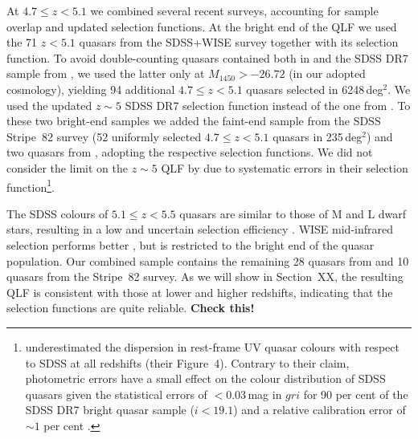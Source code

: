 \documentclass[fleqn,usenatbib]{mnras}
\begin{document}
At $4.7\le z<5.1$ we combined several recent surveys, accounting for
sample overlap and updated selection functions. At the bright end of
the QLF we used the 71 $z<5.1$ quasars from the SDSS+WISE survey
\citep{2016ApJ...829...33Y} together with its selection function.
To avoid double-counting quasars contained both in
\citet{2016ApJ...829...33Y} and the SDSS DR7 sample from
\citet{2013ApJ...768..105M}, we used the latter only at
$M_{1450}>-26.72$ (in our adopted cosmology), yielding 94 additional
$4.7\le z<5.1$ quasars selected in 6248\,deg$^2$. We used the updated
$z\sim 5$ SDSS DR7 selection function \citep{2013ApJ...768..105M}
instead of the one from \citet{2006AJ....131.2766R}.
To these two bright-end samples we added the faint-end sample from the
\citet{2013ApJ...768..105M} SDSS Stripe~82 survey (52 uniformly
selected $4.7\le z<5.1$ quasars in 235\,deg$^2$) and two quasars from
\citet{2011ApJ...728L..26G}, adopting the respective selection
functions. We did not consider the limit on the $z\sim 5$ QLF by
\citet{2012ApJ...756..160I} due to systematic errors in their
selection function\footnote{\citet{2012ApJ...756..160I} underestimated
  the dispersion in rest-frame UV quasar colours with respect to SDSS
  at all redshifts (their Figure~4). Contrary to their claim,
  photometric errors have a small effect on the colour distribution of
  SDSS quasars given the statistical errors of $<0.03$\,mag in $gri$
  for 90 per cent of the SDSS DR7 bright quasar sample ($i<19.1$) and
  a relative calibration error of $\sim 1$ per cent
  \citep{2008ApJ...674.1217P}.}.

The SDSS colours of $5.1\le z<5.5$ quasars are similar to those of M
and L dwarf stars, resulting in a low and uncertain selection
efficiency \citep{2013ApJ...768..105M}. WISE mid-infrared selection
performs better \citep{2016ApJ...829...33Y}, but is restricted to the
bright end of the quasar population. Our combined sample contains the
remaining 28 quasars from \citet{2016ApJ...829...33Y} and 10 quasars
from the \citet{2013ApJ...768..105M} Stripe~82 survey. As we will show
in Section~XX, the resulting QLF is consistent with those at lower and
higher redshifts, indicating that the \citet{2013ApJ...768..105M}
selection functions are quite reliable. \textbf{Check this!}
\end{document}
